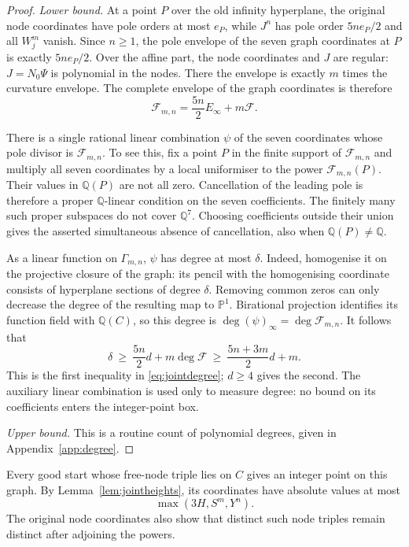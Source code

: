 \documentclass[11pt]{article}
\theoremstyle{definition}
\theoremstyle{remark}
\begin{document}
\begin{proof}
\emph{Lower bound.}
At a point $P$ over the old infinity hyperplane, the original node
coordinates have pole orders at most $e_P$, while
$J^n$ has pole order $5ne_P/2$ and all $W_j^m$ vanish.
Since $n\ge1$, the pole envelope of the seven graph coordinates at
$P$ is exactly $5ne_P/2$.
Over the affine part, the node coordinates and $J$ are regular:
$J=N_0\Psi$ is polynomial in the nodes.  There the envelope is exactly
$m$ times the curvature envelope.  The complete envelope of the graph
coordinates is therefore
\[
 \mathcal F_{m,n}=\frac{5n}{2}E_\infty+m\mathcal F.
\]

There is a single rational linear combination $\psi$ of the seven
coordinates whose pole divisor is $\mathcal F_{m,n}$.  To see this, fix a point $P$
in the finite support of $\mathcal F_{m,n}$ and multiply all seven coordinates by a
local uniformiser to the power $\mathcal F_{m,n}(P)$.  Their values in $\mathbb Q(P)$
are not all zero.  Cancellation of the leading pole is therefore a
proper $\mathbb Q$-linear condition on the seven coefficients.
The finitely many such proper subspaces do not cover $\mathbb Q^7$.
Choosing coefficients outside their union gives the asserted
simultaneous absence of cancellation, also when $\mathbb Q(P)\ne\mathbb Q$.

As a linear function on $\Gamma_{m,n}$, $\psi$ has degree at most
$\delta$.  Indeed, homogenise it on the projective closure of the
graph: its pencil with the homogenising coordinate consists of
hyperplane sections of degree $\delta$.  Removing common zeros can
only decrease the degree of the resulting map to $\mathbb P^1$.
Birational projection identifies its function field with $\mathbb Q(C)$,
so this degree is $\deg(\psi)_\infty=\deg \mathcal F_{m,n}$.  It follows that
\[
 \delta\ \ge\ \frac{5n}{2}d+m\deg \mathcal F
 \ \ge\ \frac{5n+3m}{2}d+m.
\]
This is the first inequality in \eqref{eq:jointdegree}; $d\ge4$ gives
the second.  The auxiliary linear combination is used only to measure
degree: no bound on its coefficients enters the integer-point box.

\emph{Upper bound.} This is a routine count of polynomial degrees, given in
Appendix~\ref{app:degree}.
\end{proof}

Every good start whose free-node triple lies on $C$ gives an integer point on this graph.
By Lemma~\ref{lem:jointheights}, its coordinates have absolute values
at most
\[
 \max(3H,S^m,Y^n).
\]
The original node coordinates also show that distinct such node
triples remain distinct after adjoining the powers.
\end{document}
